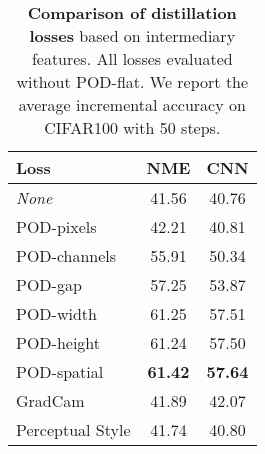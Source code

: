 \begin{table*}[!htbp]
    \centering
    \begin{tabular}{@{}lcc@{}}
        \toprule
        Loss                                                                     & NME            & CNN            \\
        \midrule
        \textit{None}                                                            & 41.56          & 40.76          \\
        POD-pixels                                                               & 42.21          & 40.81          \\
        POD-channels                                                             & 55.91          & 50.34          \\
        POD-gap                                                                  & 57.25          & 53.87          \\
        POD-width                                                                & 61.25          & 57.51          \\
        POD-height                                                               & 61.24          & 57.50          \\
        POD-spatial                                                              & \textbf{61.42} & \textbf{57.64} \\
        \hdashline
        GradCam \scriptsize{\citep{dhar2019learning_without_memorizing_gradcam}} & 41.89          & 42.07          \\
        Perceptual Style \scriptsize{\citep{johnson2016perceptual_losses}}       & 41.74          & 40.80          \\
        \bottomrule
    \end{tabular}
    \caption{\textbf{Comparison of distillation losses} based on intermediary features. All losses evaluated
        without POD-flat. We report the average incremental accuracy on CIFAR100 with 50 steps.}
    \label{tab:podnet_ablation_perceptual_noflat}
\end{table*}
